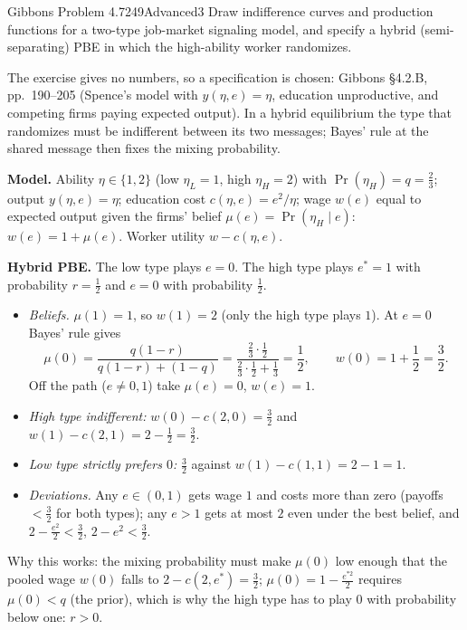 \begin{exsol}{Gibbons Problem 4.7}{249}{Advanced}{3}
\asked Draw indifference curves and production functions for a two-type job-market signaling
model, and specify a hybrid (semi-separating) PBE in which the high-ability worker randomizes.

\method The exercise gives no numbers, so a specification is chosen: Gibbons \S4.2.B, pp.~190--205 (Spence's
model with $y(\eta, e) = \eta$, education unproductive, and competing firms paying expected output).
In a hybrid equilibrium the type that randomizes must be indifferent between its two messages;
Bayes' rule at the shared message then fixes the mixing probability.

\solution \textbf{Model.} Ability $\eta \in \{1, 2\}$ (low $\eta_L = 1$, high $\eta_H = 2$) with
$\Pr(\eta_H) = q = \frac23$; output $y(\eta, e) = \eta$; education cost $c(\eta, e) = e^2/\eta$;
wage $w(e)$ equal to expected output given the firms' belief $\mu(e) = \Pr(\eta_H \mid e)$:
$w(e) = 1 + \mu(e)$. Worker utility $w - c(\eta, e)$.

\textbf{Hybrid PBE.} The low type plays $e = 0$. The high type plays $e^* = 1$ with probability
$r = \frac12$ and $e = 0$ with probability $\frac12$.
\begin{itemize}
  \item \emph{Beliefs.} $\mu(1) = 1$, so $w(1) = 2$ (only the high type plays $1$). At $e = 0$ Bayes' rule gives
  \[
    \mu(0) = \frac{q(1-r)}{q(1-r) + (1-q)} = \frac{\frac23 \cdot \frac12}{\frac23 \cdot \frac12 + \frac13} = \frac12,
    \qquad w(0) = 1 + \frac12 = \frac32 .
  \]
  Off the path ($e \ne 0, 1$) take $\mu(e) = 0$, $w(e) = 1$.
  \item \emph{High type indifferent:} $w(0) - c(2, 0) = \frac32$ and $w(1) - c(2, 1) = 2 - \frac12 = \frac32$.
  \item \emph{Low type strictly prefers $0$:} $\frac32$ against $w(1) - c(1, 1) = 2 - 1 = 1$.
  \item \emph{Deviations.} Any $e \in (0, 1)$ gets wage $1$ and costs more than zero (payoffs $< \frac32$ for
  both types); any $e > 1$ gets at most $2$ even under the best belief, and $2 - \frac{e^2}{2} < \frac32$,
  $2 - e^2 < \frac32$.
\end{itemize}
Why this works: the mixing probability must make $\mu(0)$ low enough that the pooled wage $w(0)$ falls
to $2 - c(2, e^*) = \frac32$; $\mu(0) = 1 - \frac{e^{*2}}{2}$ requires $\mu(0) < q$ (the prior), which is why
the high type has to play $0$ with probability below one: $r > 0$.


\end{exsol}
